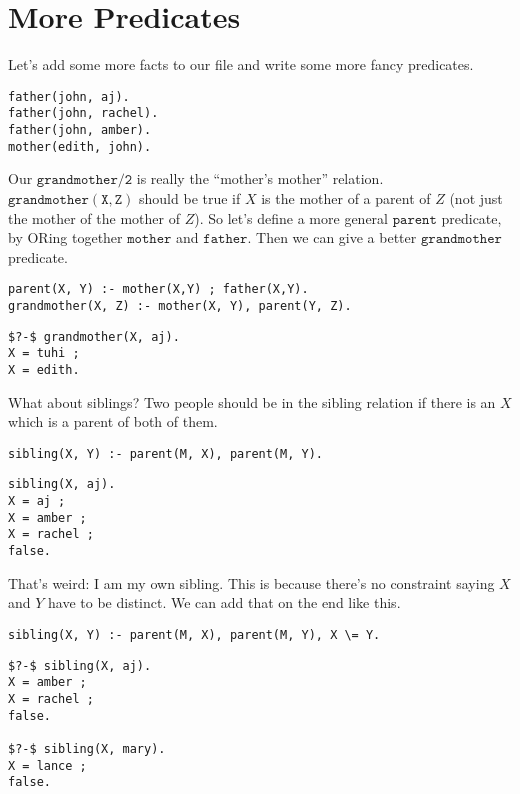 \documentclass[a4paper,12pt]{article}
\newcommand{\kwa}[1]{\mathtt{#1}}
\begin{document}
\section{More Predicates}

Let's add some more facts to our file and write some more fancy predicates.

\begin{lstlisting}
father(john, aj).
father(john, rachel).
father(john, amber).
mother(edith, john).
\end{lstlisting}

\noindent
Our $\kwa{grandmother \slash 2}$ is really the ``mother's mother'' relation. $\kwa{grandmother(X,Z)}$ should be true if $X$ is the mother of a parent of $Z$ (not just the mother of the mother of $Z$). So let's define a more general $\kwa{parent}$ predicate, by ORing together $\kwa{mother}$ and $\kwa{father}$. Then we can give a better $\kwa{grandmother}$ predicate.

\begin{lstlisting}
parent(X, Y) :- mother(X,Y) ; father(X,Y).
grandmother(X, Z) :- mother(X, Y), parent(Y, Z).
\end{lstlisting}

\begin{lstlisting}
$?-$ grandmother(X, aj).
X = tuhi ;
X = edith.
\end{lstlisting} 

\noindent
What about siblings? Two people should be in the sibling relation if there is an $X$ which is a parent of both of them.

\begin{lstlisting}
sibling(X, Y) :- parent(M, X), parent(M, Y).
\end{lstlisting}

\begin{lstlisting}
sibling(X, aj).
X = aj ;
X = amber ;
X = rachel ;
false.
\end{lstlisting}

\noindent
That's weird: I am my own sibling. This is because there's no constraint saying $X$ and $Y$ have to be distinct. We can add that on the end like this.

\begin{lstlisting}
sibling(X, Y) :- parent(M, X), parent(M, Y), X \= Y.
\end{lstlisting}

\begin{lstlisting}
$?-$ sibling(X, aj).
X = amber ;
X = rachel ;
false.

$?-$ sibling(X, mary).
X = lance ;
false.
\end{lstlisting}
\end{document}
